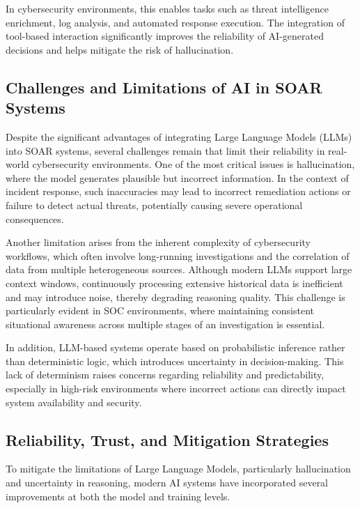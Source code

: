 \documentclass[12pt]{report}
\begin{document}
In cybersecurity environments, this enables tasks such as threat intelligence enrichment, log analysis, and automated response execution. The integration of tool-based interaction significantly improves the reliability of AI-generated decisions and helps mitigate the risk of hallucination.

\subsection{Challenges and Limitations of AI in SOAR Systems}

Despite the significant advantages of integrating Large Language Models (LLMs) into SOAR systems, several challenges remain that limit their reliability in real-world cybersecurity environments. One of the most critical issues is hallucination, where the model generates plausible but incorrect information. In the context of incident response, such inaccuracies may lead to incorrect remediation actions or failure to detect actual threats, potentially causing severe operational consequences.

Another limitation arises from the inherent complexity of cybersecurity workflows, which often involve long-running investigations and the correlation of data from multiple heterogeneous sources. Although modern LLMs support large context windows, continuously processing extensive historical data is inefficient and may introduce noise, thereby degrading reasoning quality. This challenge is particularly evident in SOC environments, where maintaining consistent situational awareness across multiple stages of an investigation is essential.

In addition, LLM-based systems operate based on probabilistic inference rather than deterministic logic, which introduces uncertainty in decision-making. This lack of determinism raises concerns regarding reliability and predictability, especially in high-risk environments where incorrect actions can directly impact system availability and security.

\subsection{Reliability, Trust, and Mitigation Strategies}

To mitigate the limitations of Large Language Models, particularly hallucination and uncertainty in reasoning, modern AI systems have incorporated several improvements at both the model and training levels.
\end{document}
